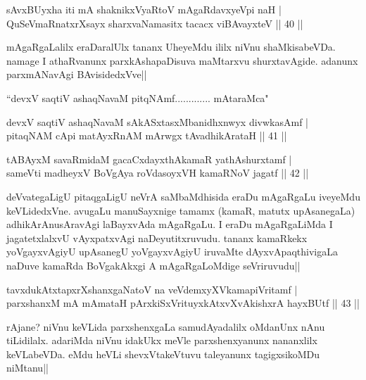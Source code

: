
\begin{shl}
sAvxBUyxha iti mA shaknikxVyaRtoV mAgaRdavxyeV\s pi naH | \\
QuSeVmaRnatxrXsayx sharxvaNamasitx tacacx viBAvayxteV \hfill|| 40 || 
\end{shl}

\begin{artha}
mAgaRgaLalilx eraDaralUlx tananx UheyeMdu ililx niVnu shaMkisabeVDa. 
namage I athaRvanunx parxkAshapaDisuva maMtarxvu shurxtavAgide. 
adanunx parxmANavAgi BAvisidedxVve||
\end{artha}


\begin{shl}
``devxV saqtiV ashaqNavaM pitqNAmf............. mAtaraMca"
\end{shl}


\begin{shl}
devxV saqtiV ashaqNavaM sAkASxtasxMbanidhxnwyx divwkasAmf | \\
pitaqNAM cApi matAyxRnAM mArwgx tAvadhikArataH \hfill|| 41 || 
\end{shl}

\begin{shl}
tABAyxM savaRmidaM gacaCxdayxthAkamaR yathAshurxtamf | \\
sameVti madheyxV BoVgAya roVdasoyxVH kamaRNoV jagatf \hfill|| 42 || 
\end{shl}

\begin{artha}
deVvategaLigU pitaqgaLigU neVrA saMbaMdhisida eraDu mAgaRgaLu iveyeMdu 
keVLidedxVne. avugaLu manuSayxnige tamamx (kamaR, matutx upAsanegaLa) 
adhikArAnusAravAgi laBayxvAda mAgaRgaLu. I eraDu mAgaRgaLiMda I 
jagatetxlalxvU vAyxpatxvAgi naDeyutitxruvudu. tananx kamaRkekx 
yoVgayxvAgiyU upAsanegU yoVgayxvAgiyU iruvaMte dAyxvApaqthivigaLa 
naDuve kamaRda BoVgakAkxgi A mAgaRgaLoMdige seVriruvudu||
\end{artha}

\begin{shl}
tavxdukAtxtapxrXshanxgaNatoV na veVdemxyXVkamapiVritamf | \\
parxshanxM mA mAmataH pArxkiSxVrituyxkAtxvX\s vAkishxrA hayxBUtf \hfill|| 43 || 
\end{shl}

\begin{artha}
rAjane? niVnu keVLida parxshenxgaLa samudAyadalilx oMdanUnx nAnu 
tiLidilalx. adariMda niVnu idakUkx meVle parxshenxyanunx nananxlilx 
keVLabeVDa. eMdu heVLi shevxVtakeVtuvu taleyanunx tagigxsikoMDu 
niMtanu||
\end{artha}


